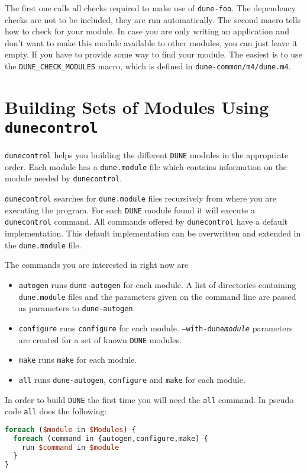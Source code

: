 \documentclass[11pt,a4paper,headinclude,footinclude,DIV16,normalheadings]{scrartcl}
\newcommand{\dune}{\texttt{DUNE}\xspace}
\newcommand{\autogen}{\texttt{dune-autogen}\xspace}
\newcommand{\configure}{\texttt{configure}\xspace}
\newcommand{\dunecontrol}{\texttt{dunecontrol}\xspace}
\newcommand{\dunemodule}{\texttt{dune.module}\xspace}
\newcommand{\make}{\texttt{make}\xspace}
\begin{document}
The first one calls all checks required to make use of
\texttt{dune-foo}. The dependency checks are not to be included, they
are run automatically. The second macro tells how to check for your
module. In case you are only writing an application and don't want to
make this module available to other modules, you can just leave it
empty. If you have to provide some way to find your module. The
easiest is to use the \texttt{DUNE\_CHECK\_MODULES} macro, which is
defined in \texttt{dune-common/m4/dune.m4}.

\section{Building Sets of Modules Using \dunecontrol}
\label{dunecontrol}
\dunecontrol helps you building the different \dune modules in the
appropriate order. Each module has a \dunemodule file which contains
information on the module needed by \dunecontrol. 

\dunecontrol searches for \dunemodule files recursively from where you
are executing the program. For each \dune module found it will execute
a \dunecontrol command. All commands offered by \dunecontrol have a
default implementation. This default implementation can be overwritten
and extended in the \dunemodule file.

The commands you are interested in right now are
\begin{itemize}
\item \texttt{autogen} runs \autogen for each module. A list of
  directories containing \dunemodule files and the parameters given on
  the command line are passed as parameters to \autogen.
\item \texttt{configure} runs \configure for each
  module. \texttt{--with-dune\textit{module}} parameters are created
  for a set of known \dune modules.
\item \texttt{make} runs \make for each module.
\item \texttt{all} runs \autogen, \configure and \make for each module.
\end{itemize}

In order to build \dune the first time you will need the \texttt{all}
command. In pseudo code \texttt{all} does the following:
\begin{lstlisting}[language=Perl]
foreach ($module in $Modules) {
  foreach (command in {autogen,configure,make) {
    run $command in $module
  }
}
\end{lstlisting}
\end{document}
